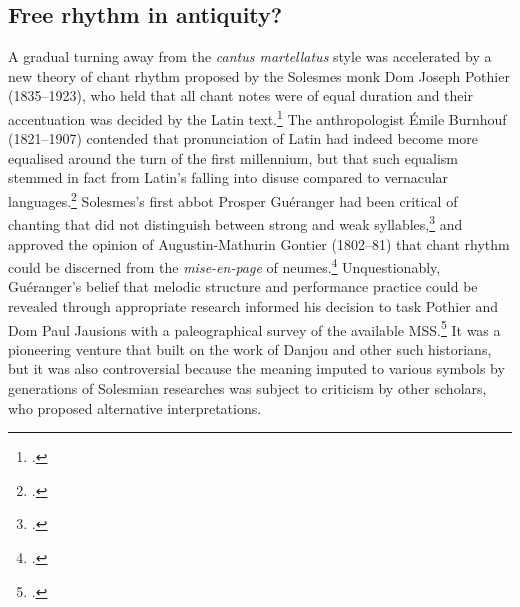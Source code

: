 \subsection{Free rhythm in antiquity?}
A gradual turning away from the \emph{cantus martellatus} style was accelerated by a new theory of chant rhythm proposed by the Solesmes monk Dom Joseph Pothier (1835--1923), who held that all chant notes were of equal duration and their accentuation was decided by the Latin text.\footcites[204--205]{Pothiermelodiesgregoriennesapres1880}[16]{RayburnGregorianChantHistory1964}
The anthropologist Émile Burnhouf (1821--1907) contended that pronunciation of Latin had indeed become more equalised around the turn of the first millennium, but that such equalism stemmed in fact from Latin's falling into disuse compared to vernacular languages.\footcite[80]{Burnhoufchantsegliselatine1887}
Solesmes's first abbot Prosper Guéranger had been critical of chanting that did not distinguish between strong and weak syllables,\footcite[`Approbation du très-révérend père abbé de Solesmes' in][p.~x]{GontierMethoderaisonneeplainchant1859} and approved the opinion of Augustin-Mathurin Gontier (1802--81) that chant rhythm could be discerned from the \emph{mise-en-page} of neumes.\footcite[12]{Gontierplainchantsonexecution1860}
Unquestionably, Guéranger's belief that melodic structure and performance practice could be revealed through appropriate research informed his decision to task Pothier and Dom Paul Jausions with a paleographical survey of the available MSS.\footcite[16, 34; Combe's account was first published in issues of the \emph{Etudes grégoriennes} from 1963 to 1968]{CombeRestorationGregorianChant2003}
It was a pioneering venture that built on the work of Danjou and other such historians, but it was also controversial because the meaning imputed to various symbols by generations of Solesmian researches was subject to criticism by other scholars, who proposed alternative interpretations.

